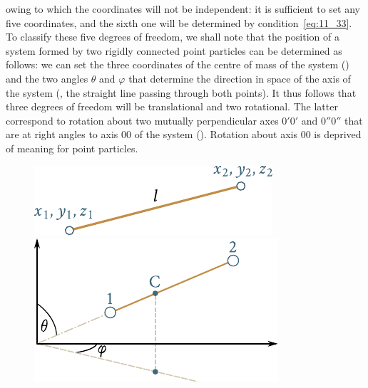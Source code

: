 \noindent
owing to which the coordinates will not be independent: it is sufficient to set any five coordinates, and the sixth one will be determined by condition~\eqref{eq:11_33}. To classify these five degrees of freedom, we shall note that the position of a system formed by two rigidly connected point particles can be determined as follows: we can set the three coordinates of the centre of mass of the system () and the two angles $\theta$ and $\varphi$ that determine the direction in space of the axis of the system (\ie, the straight line passing through both points). It thus follows that three degrees of freedom will be translational and two rotational. The latter correspond to rotation about two mutually perpendicular axes $0'0'$ and $0''0''$ that are at right angles to axis $00$ of the system (). Rotation about axis $00$ is deprived of meaning for point particles.

\begin{figure}[t]
	\begin{minipage}[t]{0.5\linewidth}
		\begin{center}
			\includegraphics[scale=1.0]{figures/ch_11/fig_11_9.pdf}
			\caption[]{}
			\label{fig:11_9}
		\end{center}
	\end{minipage}
	\hspace{-0.05cm}
	\begin{minipage}[t]{0.5\linewidth}
		\begin{center}
			\includegraphics[scale=1.0]{figures/ch_11/fig_11_10.pdf}
			\caption[]{}
			\label{fig:11_10}
		\end{center}
	\end{minipage}
\end{figure}


